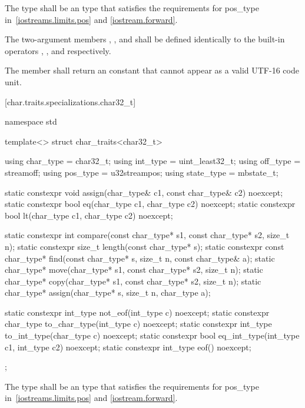 \pnum
The type
shall be an  type that satisfies the requirements
for pos_type in~\ref{iostreams.limits.pos} and \ref{iostream.forward}.

\pnum
The two-argument members ,
, and  shall be defined identically to
the built-in operators \tcode{=}, \tcode{==}, and
\tcode{<} respectively.

\pnum
The member  shall return an
 constant that cannot appear
as a valid UTF-16 code unit.

[char.traits.specializations.char32_t]{}

%
\begin{codeblock}
namespace std {
  template<> struct char_traits<char32_t> {
    using char_type  = char32_t;
    using int_type   = uint_least32_t;
    using off_type   = streamoff;
    using pos_type   = u32streampos;
    using state_type = mbstate_t;

    static constexpr void assign(char_type& c1, const char_type& c2) noexcept;
    static constexpr bool eq(char_type c1, char_type c2) noexcept;
    static constexpr bool lt(char_type c1, char_type c2) noexcept;

    static constexpr int compare(const char_type* s1, const char_type* s2, size_t n);
    static constexpr size_t length(const char_type* s);
    static constexpr const char_type* find(const char_type* s, size_t n,
                                           const char_type& a);
    static char_type* move(char_type* s1, const char_type* s2, size_t n);
    static char_type* copy(char_type* s1, const char_type* s2, size_t n);
    static char_type* assign(char_type* s, size_t n, char_type a);

    static constexpr int_type not_eof(int_type c) noexcept;
    static constexpr char_type to_char_type(int_type c) noexcept;
    static constexpr int_type to_int_type(char_type c) noexcept;
    static constexpr bool eq_int_type(int_type c1, int_type c2) noexcept;
    static constexpr int_type eof() noexcept;
  };
}
\end{codeblock}

\pnum
The type
shall be an  type that satisfies the requirements
for pos_type in~\ref{iostreams.limits.pos} and \ref{iostream.forward}.


